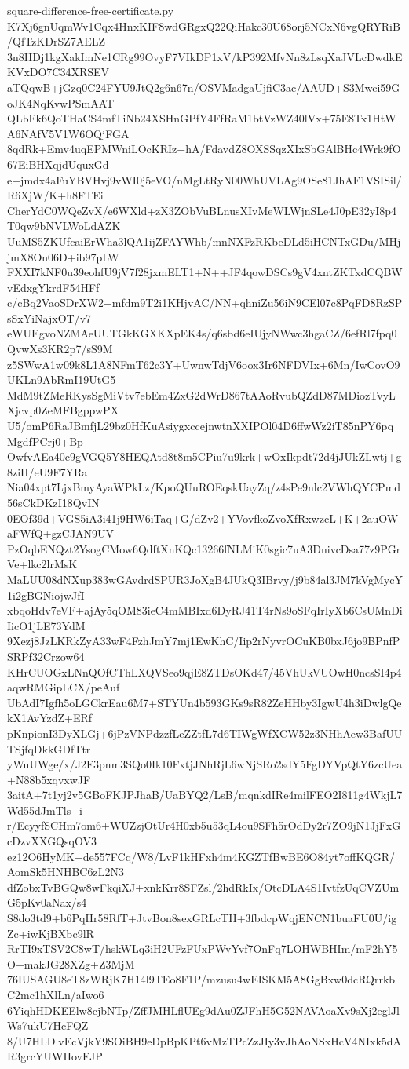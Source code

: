 \documentclass[11pt]{article}
\theoremstyle{definition}
\theoremstyle{remark}
\begin{document}
\begin{filecontents*}[overwrite]{square-difference-free-certificate.py}
K7Xj6gnUqmWv1Cqx4HnxKIF8wdGRgxQ22QiHakc30U68orj5NCxN6vgQRYRiB/QfTzKDrSZ7AELZ
3n8HDj1kgXakImNe1CRg99OvyF7VIkDP1xV/kP392MfvNn8zLsqXaJVLcDwdkEKVxDO7C34XRSEV
aTQqwB+jGzq0C24FYU9JtQ2g6n67n/OSVMadgaUjfiC3ac/AAUD+S3Mwci59GoJK4NqKvwPSmAAT
QLbFk6QoTHaCS4mfTiNb24XSHnGPfY4FfRaM1btVzWZ40lVx+75E8Tx1HtWA6NAfV5V1W6OQjFGA
8qdRk+Emv4uqEPMWniLOcKRIz+hA/FdavdZ8OXSSqzXIxSbGAlBHc4Wrk9fO67EiBHXqjdUquxGd
e+jmdx4aFuYBVHvj9vWI0j5eVO/nMgLtRyN00WhUVLAg9OSe81JhAF1VSISil/R6XjW/K+h8FTEi
CherYdC0WQeZvX/e6WXld+zX3ZObVuBLnusXIvMeWLWjnSLe4J0pE32yI8p4T0qw9bNVLWoLdAZK
UuMS5ZKUfcaiErWha3lQA1ijZFAYWhb/mnNXFzRKbeDLd5iHCNTxGDu/MHjjmX8On06D+ib97pLW
FXXI7kNF0u39eohfU9jV7f28jxmELT1+N++JF4qowDSCs9gV4xntZKTxdCQBWvEdxgYkrdF54HFf
c/cBq2VaoSDrXW2+mfdm9T2i1KHjvAC/NN+qhniZu56iN9CEl07c8PqFD8RzSPsSxYiNajxOT/v7
eWUEgvoNZMAeUUTGkKGXKXpEK4s/q6sbd6eIUjyNWwc3hgaCZ/6efRl7fpq0QvwXs3KR2p7/sS9M
z5SWwA1w09k8L1A8NFmT62c3Y+UwnwTdjV6oox3Ir6NFDVIx+6Mn/IwCovO9UKLn9AbRmI19UtG5
MdM9tZMeRKysSgMiVtv7ebEm4ZxG2dWrD867tAAoRvubQZdD87MDiozTvyLXjcvp0ZeMFBgppwPX
U5/omP6RaJBmfjL29bz0HfKuAsiygxccejnwtnXXIPOl04D6ffwWz2iT85nPY6pqMgdfPCrj0+Bp
OwfvAEa40c9gVGQ5Y8HEQAtd8t8m5CPiu7u9krk+wOxIkpdt72d4jJUkZLwtj+g8ziH/eU9F7YRa
Nia04xpt7LjxBmyAyaWPkLz/KpoQUuROEqskUayZq/z4sPe9nlc2VWhQYCPmd56sCkDKzI18QvIN
0EOf39d+VGS5iA3i41j9HW6iTaq+G/dZv2+YVovfkoZvoXfRxwzcL+K+2auOWaFWfQ+gzCJAN9UV
PzOqbENQzt2YsogCMow6QdftXnKQc13266fNLMiK0sgic7uA3DnivcDsa77z9PGrVe+lkc2lrMsK
MaLUU08dNXup383wGAvdrdSPUR3JoXgB4JUkQ3IBrvy/j9b84al3JM7kVgMycY1i2gBGNiojwJfI
xbqoHdv7eVF+ajAy5qOM83ieC4mMBIxd6DyRJ41T4rNs9oSFqIrIyXb6CsUMnDiIicO1jLE73YdM
9Xezj8JzLKRkZyA33wF4FzhJmY7mj1EwKhC/Iip2rNyvrOCuKB0bxJ6jo9BPnfPSRPf32Crzow64
KHrCUOGxLNnQOfCThLXQVSeo9qjE8ZTDsOKd47/45VhUkVUOwH0ncsSI4p4aqwRMGipLCX/peAuf
UbAdI7Igfh5oLGCkrEau6M7+STYUn4b593GKs9sR82ZeHHby3IgwU4h3iDwlgQekX1AvYzdZ+ERf
pKnpionI3DyXLGj+6jPzVNPdzzfLeZZtfL7d6TIWgWfXCW52z3NHhAew3BafUUTSjfqDkkGDfTtr
yWuUWge/x/J2F3pnm3SQo0Ik10FxtjJNhRjL6wNjSRo2sdY5FgDYVpQtY6zcUea+N88b5xqvxwJF
3aitA+7t1yj2v5GBoFKJPJhaB/UaBYQ2/LsB/mqnkdIRe4milFEO2I811g4WkjL7Wd55dJmTls+i
r/EcyyfSCHm7om6+WUZzjOtUr4H0xb5u53qL4ou9SFh5rOdDy2r7ZO9jN1JjFxGcDzvXXGQsqOV3
ez12O6HyMK+de557FCq/W8/LvF1kHFxh4m4KGZTfBwBE6O84yt7offKQGR/AomSk5HNHBC6zL2N3
dfZobxTvBGQw8wFkqiXJ+xnkKrr8SFZsl/2hdRkIx/OtcDLA4S1IvtfzUqCVZUmG5pKv0aNax/s4
S8do3td9+b6PqHr58RfT+JtvBon8sexGRLcTH+3fbdcpWqjENCN1buaFU0U/igZc+iwKjBXbc9lR
RrTI9xTSV2C8wT/hskWLq3iH2UFzFUxPWvYvf7OnFq7LOHWBHIm/mF2hY5O+makJG28XZg+Z3MjM
76IUSAGU8eT8zWRjK7H14l9TEo8F1P/mzusu4wEISKM5A8GgBxw0dcRQrrkbC2mc1hXlLn/aIwo6
6YiqhHDKEElw8cjbNTp/ZffJMHLflUEg9dAu0ZJFhH5G52NAVAoaXv9sXj2eglJlWs7ukU7HcFQZ
8/U7HLDlvEcVjkY9SOiBH9eDpBpKPt6vMzTPcZzJIy3vJhAoNSxHcV4NIxk5dAR3grcYUWHovFJP

\end{filecontents*}
\end{document}
